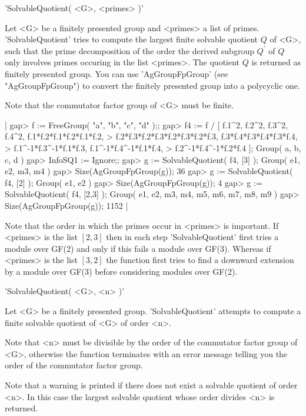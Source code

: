 
'SolvableQuotient( <G>, <primes> )'

Let <G>  be a finitely  presented  group and  <primes> a list  of primes.
'SolvableQuotient' tries to  compute the largest finite solvable quotient
$Q$ of <G>,  such that the  prime decomposition of  the order the derived
subgroup $Q^\prime$  of  $Q$ only involves  primes occuring  in the  list
<primes>.  The quotient $Q$ is returned as finitely presented group.  You
can use  'AgGroupFpGroup' (see "AgGroupFpGroup")  to convert the finitely
presented group into a polycyclic one.

Note that the commutator factor group of <G> must be finite.

|    gap> f := FreeGroup( "a", "b", "c", "d" );;
    gap> f4 := f / [ f.1^2, f.2^2, f.3^2, f.4^2, f.1*f.2*f.1*f.2*f.1*f.2,
    >      f.2*f.3*f.2*f.3*f.2*f.3*f.2*f.3, f.3*f.4*f.3*f.4*f.3*f.4,
    >      f.1^-1*f.3^-1*f.1*f.3, f.1^-1*f.4^-1*f.1*f.4,
    >      f.2^-1*f.4^-1*f.2*f.4 ];
    Group( a, b, c, d )
    gap> InfoSQ1 := Ignore;;
    gap> g := SolvableQuotient( f4, [3] );
    Group( e1, e2, m3, m4 )
    gap> Size(AgGroupFpGroup(g));
    36
    gap> g := SolvableQuotient( f4, [2] );
    Group( e1, e2 )
    gap> Size(AgGroupFpGroup(g));
    4
    gap> g := SolvableQuotient( f4, [2,3] );
    Group( e1, e2, m3, m4, m5, m6, m7, m8, m9 )
    gap> Size(AgGroupFpGroup(g));
    1152 |

Note that the order  in which the primes occur  in <primes> is important.
If <primes> is the list    $[2,3]$ then in each step   'SolvableQuotient'
first  tries a module over  GF(2)  and only  if this  fails a module over
GF(3).  Whereas if <primes> is the  list $[3,2]$ the function first tries
to find  a downward extension  by a module  over GF(3) before considering
modules over GF(2).

'SolvableQuotient( <G>, <n> )'

Let <G> be  a finitely presented  group.  'SolvableQuotient'  attempts to
compute a finite solvable quotient of <G> of order <n>.

Note that  <n> must be  divisible by the  order  of the commutator factor
group of  <G>, otherwise the  function terminates  with  an error message
telling you the order of the commutator factor group.

Note that a  warning is   printed if there    does not exist  a  solvable
quotient of order <n>.  In this case the  largest solvable quotient whose
order divides <n> is returned.

